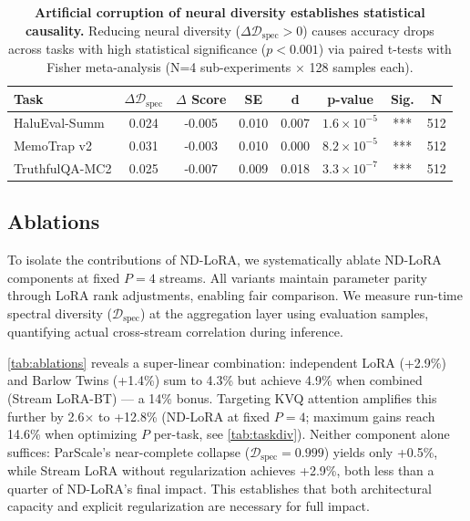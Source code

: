 \documentclass{article} %
\begin{document}
\begin{table}[t]
  \centering
  \begin{tabular}{l|ccccccc}
    \textbf{Task} & \textbf{$\Delta\mathcal{D}_{\text{spec}}$} & \textbf{$\Delta$ Score} & \textbf{SE} &
    \textbf{d} & \textbf{p-value} & \textbf{Sig.} & \textbf{N} \\
    \hline
    HaluEval-Summ & 0.024 & -0.005 & 0.010 & 0.007 & $1.6 \times 10^{-5}$ & *** & 512 \\
    MemoTrap v2 & 0.031 & -0.003 & 0.010 & 0.000 & $8.2 \times 10^{-5}$ & *** & 512 \\
    TruthfulQA-MC2 & 0.025 & -0.007 & 0.009 & 0.018 & $3.3 \times 10^{-7}$ & *** & 512 \\
  \end{tabular}
  \caption{
    \textbf{Artificial corruption of neural diversity establishes statistical causality.} Reducing neural diversity
    ($\Delta\mathcal{D}_{\text{spec}} > 0$) causes accuracy drops across tasks with high statistical
    significance ($p < 0.001$) via paired t-tests with Fisher meta-analysis (N=4 sub-experiments × 128 samples each).
  }
  \label{tab:causality}
\end{table}

\subsection{Ablations}
To isolate the contributions of ND-LoRA, we systematically ablate ND-LoRA components at fixed $P=4$ streams.
All variants maintain parameter parity through LoRA rank adjustments, enabling fair comparison. We measure
run-time spectral diversity ($\mathcal{D}_{\text{spec}}$) at the aggregation layer using evaluation samples,
quantifying actual cross-stream correlation during inference.

\autoref{tab:ablations} reveals a super-linear combination: independent LoRA (+2.9\%) and Barlow Twins
(+1.4\%) sum to 4.3\% but achieve 4.9\% when combined (Stream LoRA-BT) --- a 14\% bonus. Targeting KVQ
attention amplifies this further by 2.6$\times$ to +12.8\% (ND-LoRA at fixed $P=4$; maximum gains reach
14.6\% when optimizing $P$ per-task, see \autoref{tab:taskdiv}). Neither component alone
suffices: ParScale's near-complete collapse ($\mathcal{D}_{\text{spec}} = 0.999$) yields only +0.5\%, while
Stream LoRA without regularization achieves +2.9\%, both less than a quarter of ND-LoRA's final impact. This
establishes that both architectural capacity and explicit regularization are necessary for full impact.
\end{document}

